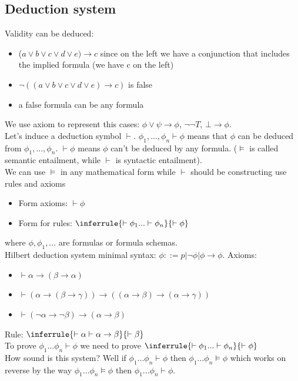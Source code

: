 \documentclass[12pt]{article}
\begin{document}
\subsection{Deduction system}
Validity can be deduced: 
\begin{itemize}
    \item ($a \lor b \lor c \lor d \lor e ) \rightarrow c$ since on the left we have a conjunction that includes the implied formula (we have c on the left)
    \item $\neg((a \lor b \lor c \lor d \lor e ) \rightarrow c)$ is false 
    \item a false formula can be any formula
\end{itemize}
We use axiom to represent this cases: $\phi \lor \psi \rightarrow \phi$, $\neg \neg T$, $\bot \rightarrow \phi$.
\\ Let's induce a deduction symbol $\vdash$. 
$\phi_1, ... , \phi_n \vdash \phi$ means that $\phi$ can be deduced from $\phi_1, ... , \phi_n$. $\vdash \phi$ means $\phi$ can't be deduced by any formula. ($\models$ is called semantic entailment, while $\vdash$ is syntactic entailment).
\\ We can use $\models$ in any mathematical form while $\vdash$ should be constructing use rules and axioms
\begin{itemize}
    \item Form axioms: $\vdash \phi$
    \item Form for rules: $ \inferrule
            { \vdash \phi_1 ... \vdash \phi_n}
            { \vdash \phi} $
\end{itemize}
where $\phi, \phi_1, ... $ are formulas or formula schemas.
\\ Hilbert deduction system minimal syntax: $\phi ::= p | \neg \phi | \phi \rightarrow \phi$.
Axioms: 
\begin{itemize}
    \item $\vdash \alpha \rightarrow (\beta \rightarrow \alpha)$
    \item $\vdash (\alpha \rightarrow (\beta \rightarrow \gamma)) \rightarrow ((\alpha \rightarrow \beta) \rightarrow (\alpha \rightarrow \gamma))$
    \item $\vdash (\neg \alpha \rightarrow \neg \beta) \rightarrow (\alpha \rightarrow \beta)$
\end{itemize}
Rule: $ \inferrule 
        { \vdash \alpha \vdash \alpha \rightarrow \beta}
        { \vdash \beta} $
\\ To prove $\phi_1 ... \phi_n \vdash \phi$ we need to prove $ \inferrule 
        { \vdash \phi_1 ... \vdash \phi_n}
        { \vdash \phi} $
\\ How sound is this system? Well if $\phi_1 ... \phi_n \vdash \phi$ then $\phi_1 ... \phi_n \models \phi$ which works on reverse by the way 
$\phi_1 ... \phi_n \models \phi$ then $\phi_1 ... \phi_n \vdash \phi$.
\end{document}
